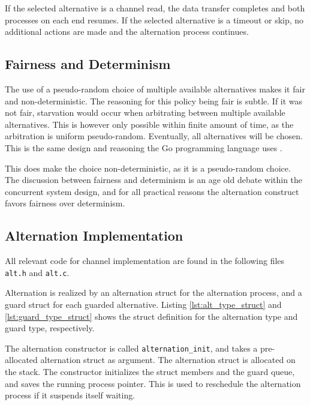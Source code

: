 If the selected alternative is a channel read, the data transfer completes and both processes on each end resumes. If the selected alternative is a timeout or skip, no additional actions are made and the alternation process continues. 


\subsection{Fairness and Determinism}
\label{subsec:alternation_fairness}

The use of a pseudo\hyp{}random choice of multiple available alternatives makes it fair and non\hyp{}deterministic. The reasoning for this policy being fair is subtle. If it was not fair, starvation would occur when arbitrating between multiple available alternatives. This is however only possible within finite amount of time, as the arbitration is uniform pseudo\hyp{}random. Eventually, all alternatives will be chosen. This is the same design and reasoning the Go programming language uses \citep[see][Select statements]{golangspec}.

This does make the choice non\hyp{}deterministic, as it is a pseudo\hyp{}random choice. The discussion between fairness and determinism is an age old debate within the concurrent system design, and for all practical reasons the alternation construct favors fairness over determinism. 


\subsection{Alternation Implementation}

All relevant code for channel implementation are found in the following files \texttt{alt.h} and \texttt{alt.c}.

Alternation is realized by an alternation struct for the alternation process, and a guard struct for each guarded alternative. Listing \ref{lst:alt_type_struct} and \ref{lst:guard_type_struct} shows the struct definition for the alternation type and guard type, respectively. 

The alternation constructor is called \texttt{alternation\_init}, and takes a pre\hyp{}allocated alternation struct as argument. The alternation struct is allocated on the stack. The constructor initializes the struct members and the guard queue, and saves the running process pointer. This is used to reschedule the alternation process if it suspends itself waiting. 

